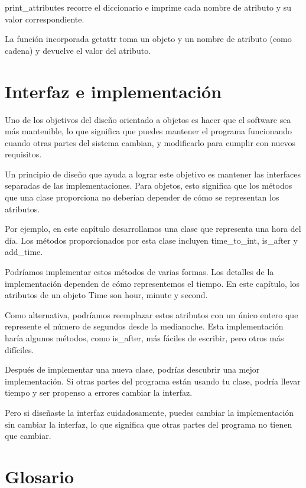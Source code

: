 print\_attributes recorre el diccionario e imprime cada nombre de atributo y su valor correspondiente.

La función incorporada getattr toma un objeto y un nombre de atributo (como cadena) y devuelve el valor del atributo.

\section{Interfaz e implementación}

Uno de los objetivos del diseño orientado a objetos es hacer que el software sea más mantenible, lo que significa que puedes mantener el programa funcionando cuando otras partes del sistema cambian, y modificarlo para cumplir con nuevos requisitos.

Un principio de diseño que ayuda a lograr este objetivo es mantener las interfaces separadas de las implementaciones. Para objetos, esto significa que los métodos que una clase proporciona no deberían depender de cómo se representan los atributos.

Por ejemplo, en este capítulo desarrollamos una clase que representa una hora del día. Los métodos proporcionados por esta clase incluyen time\_to\_int, is\_after y add\_time.

Podríamos implementar estos métodos de varias formas. Los detalles de la implementación dependen de cómo representemos el tiempo. En este capítulo, los atributos de un objeto Time son hour, minute y second.

Como alternativa, podríamos reemplazar estos atributos con un único entero que represente el número de segundos desde la medianoche. Esta implementación haría algunos métodos, como is\_after, más fáciles de escribir, pero otros más difíciles.

Después de implementar una nueva clase, podrías descubrir una mejor implementación. Si otras partes del programa están usando tu clase, podría llevar tiempo y ser propenso a errores cambiar la interfaz.

Pero si diseñaste la interfaz cuidadosamente, puedes cambiar la implementación sin cambiar la interfaz, lo que significa que otras partes del programa no tienen que cambiar.

\section{Glosario}

